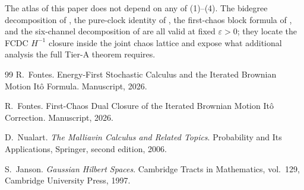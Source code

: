 \documentclass[11pt,reqno]{amsart}
\theoremstyle{plain}
\theoremstyle{definition}
\theoremstyle{remark}
\begin{document}
The atlas of this paper does not depend on any of (1)--(4). The
bidegree decomposition of , the pure-clock identity
of , the first-chaos block formula of
, and the six-channel decomposition of
 are all valid at fixed $\varepsilon>0$; they
locate the FCDC $H^{-1}$ closure inside the joint chaos lattice and
expose what additional analysis the full Tier-A theorem requires.

\begin{thebibliography}{99}
R.~Fontes.
\newblock Energy-First Stochastic Calculus and the Iterated Brownian
  Motion It\^o Formula.
\newblock Manuscript, 2026.

R.~Fontes.
\newblock First-Chaos Dual Closure of the Iterated Brownian Motion
  It\^o Correction.
\newblock Manuscript, 2026.

D.~Nualart.
\newblock \emph{The Malliavin Calculus and Related Topics}.
\newblock Probability and Its Applications, Springer, second
  edition, 2006.

S.~Janson.
\newblock \emph{Gaussian Hilbert Spaces}.
\newblock Cambridge Tracts in Mathematics, vol.~129, Cambridge
  University Press, 1997.
\end{thebibliography}
\end{document}
